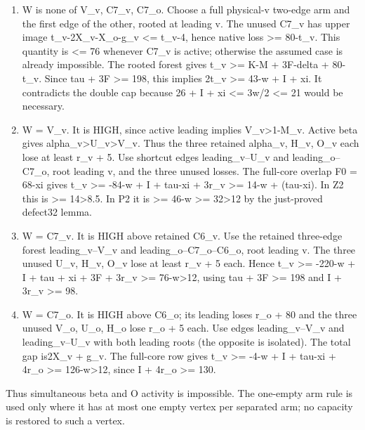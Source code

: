 \documentclass[11pt,a4paper]{article}
\newcommand{\tightlist}{\setlength{\itemsep}{0pt}\setlength{\parskip}{0pt}}
\begin{document}
\begin{enumerate}
\def\labelenumi{\arabic{enumi}.}
\tightlist
\item
  W is none of V\_v, C7\_v, C7\_o. Choose a full physical-v two-edge arm
  and the first edge of the other, rooted at leading v. The unused C7\_v
  has upper image t\_v-2X\_v-X\_o-g\_v \textless= t\_v-4, hence native
  loss \textgreater= 80-t\_v. This quantity is \textless= 76 whenever
  C7\_v is active; otherwise the assumed case is already impossible. The
  rooted forest gives t\_v \textgreater= K-M + 3F-delta + 80-t\_v. Since
  tau + 3F \textgreater= 198, this implies 2t\_v \textgreater= 43-w + I
  + xi. It contradicts the double cap because 26 + I + xi \textless=
  3w/2 \textless= 21 would be necessary.
\item
  W = V\_v. It is HIGH, since active leading implies
  V\_v\textgreater1-M\_v. Active beta gives
  alpha\_v\textgreater U\_v\textgreater V\_v. Thus the three retained
  alpha\_v, H\_v, O\_v each lose at least r\_v + 5. Use shortcut edges
  leading\_v--U\_v and leading\_o--C7\_o, root leading v, and the three
  unused losses. The full-core overlap F0 = 68-xi gives t\_v
  \textgreater= -84-w + I + tau-xi + 3r\_v \textgreater= 14-w +
  (tau-xi). In Z2 this is \textgreater= 14\textgreater8.5. In P2 it is
  \textgreater= 46-w \textgreater= 32\textgreater12 by the just-proved
  defect32 lemma.
\item
  W = C7\_v. It is HIGH above retained C6\_v. Use the retained
  three-edge forest leading\_v--V\_v and leading\_o--C7\_o--C6\_o, root
  leading v. The three unused U\_v, H\_v, O\_v lose at least r\_v + 5
  each. Hence t\_v \textgreater= -220-w + I + tau + xi + 3F + 3r\_v
  \textgreater= 76-w\textgreater12, using tau + 3F \textgreater= 198 and
  I + 3r\_v \textgreater= 98.
\item
  W = C7\_o. It is HIGH above C6\_o; its leading loses r\_o + 80 and the
  three unused V\_o, U\_o, H\_o lose r\_o + 5 each. Use edges
  leading\_v--V\_v and leading\_v--U\_v with both leading roots (the
  opposite is isolated). The total gap is2X\_v + g\_v. The full-core row
  gives t\_v \textgreater= -4-w + I + tau-xi + 4r\_o \textgreater=
  126-w\textgreater12, since I + 4r\_o \textgreater= 130.
\end{enumerate}

Thus simultaneous beta and O activity is impossible. The one-empty arm
rule is used only where it has at most one empty vertex per separated
arm; no capacity is restored to such a vertex.
\end{document}
